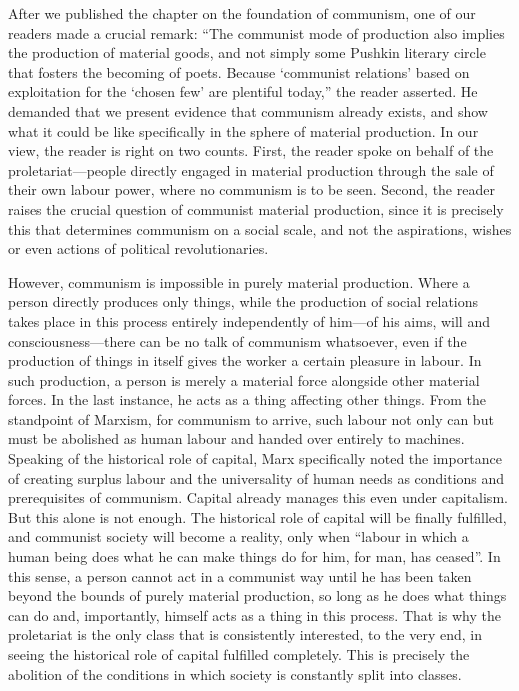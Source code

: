 \documentclass[../main]{subfiles}
\begin{document}
After we published the chapter on the foundation of communism, one of our readers made a crucial remark: “The communist mode of production also implies the production of material goods, and not simply some Pushkin literary circle that fosters the becoming of poets. Because ‘communist relations’ based on exploitation for the ‘chosen few’ are plentiful today,” the reader asserted. He demanded that we present evidence that communism already exists, and show what it could be like specifically in the sphere of material production. In our view, the reader is right on two counts. First, the reader spoke on behalf of the proletariat—people directly engaged in material production through the sale of their own labour power, where no communism is to be seen. Second, the reader raises the crucial question of communist material production, since it is precisely this that determines communism on a social scale, and not the aspirations, wishes or even actions of political revolutionaries.

However, communism is impossible in purely material production. Where a person directly produces only things, while the production of social relations takes place in this process entirely independently of him—of his aims, will and consciousness—there can be no talk of communism whatsoever, even if the production of things in itself gives the worker a certain pleasure in labour. In such production, a person is merely a material force alongside other material forces. In the last instance, he acts as a thing affecting other things. From the standpoint of Marxism, for communism to arrive, such labour not only can but must be abolished as human labour and handed over entirely to machines. Speaking of the historical role of capital, Marx specifically noted the importance of creating surplus labour and the universality of human needs as conditions and prerequisites of communism. Capital already manages this even under capitalism. But this alone is not enough. The historical role of capital will be finally fulfilled, and communist society will become a reality, only when “labour in which a human being does what he can make things do for him, for man, has ceased”. In this sense, a person cannot act in a communist way until he has been taken beyond the bounds of purely material production, so long as he does what things can do and, importantly, himself acts as a thing in this process. That is why the proletariat is the only class that is consistently interested, to the very end, in seeing the historical role of capital fulfilled completely. This is precisely the abolition of the conditions in which society is constantly split into classes.
\end{document}
